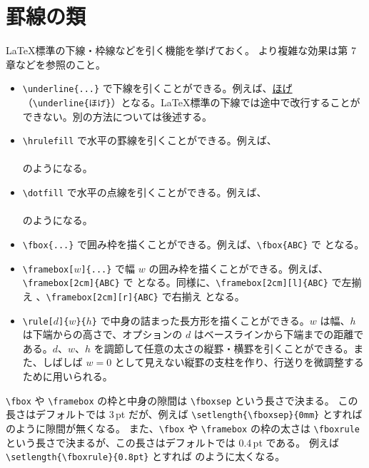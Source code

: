\section{罫線の類}
\LaTeX{}標準の下線・枠線などを引く機能を挙げておく。\enlargethispage{1.00zw}
より複雑な効果は第 7 章などを参照のこと。
\begin{itemize}\setlength{\leftskip}{-1.00zw}%
\item \verb'\underline{...}' で下線を引くことができる。例えば、\underline{ほげ}（\verb'\underline{ほげ}'）となる。\LaTeX{}標準の下線では途中で改行することができない。別の方法については後述する。
\item \verb'\hrulefill' で水平の罫線を引くことができる。例えば、\\
  \hrulefill{} \\
  のようになる。
\item \verb'\dotfill' で水平の点線を引くことができる。例えば、\\
  \dotfill{} \\
  のようになる。
\item \verb'\fbox{...}' で囲み枠を描くことができる。例えば、\verb'\fbox{ABC}' で  となる。
\item \verb'\framebox['$w$\verb']{...}' で幅 $w$ の囲み枠を描くことができる。例えば、\verb'\framebox[2cm]{ABC}' で  となる。同様に、\verb'\framebox[2cm][l]{ABC}' で左揃え 、\verb'\framebox[2cm][r]{ABC}' で右揃え  となる。
\item \verb'\rule['$d$\verb']{'$w$\verb'}{'$h$\verb'}' で中身の詰まった長方形を描くことができる。$w$ は幅、$h$ は下端からの高さで、オプションの $d$ はベースラインから下端までの距離である。$d$、$w$、$h$ を調節して任意の太さの縦罫・横罫を引くことができる。また、しばしば $w=0$ として見えない縦罫の支柱を作り、行送りを微調整するために用いられる。
\end{itemize}
\verb'\fbox' や \verb'\framebox' の枠と中身の隙間は \verb'\fboxsep' という長さで決まる。
この長さはデフォルトでは 3\,pt だが、例えば \verb'\setlength{\fboxsep}{0mm}'\setlength{\fboxsep}{0mm} とすれば \setlength{\fboxsep}{3pt} のように隙間が無くなる。
また、\verb'\fbox' や \verb'\framebox' の枠の太さは \verb'\fboxrule' という長さで決まるが、この長さはデフォルトでは 0.4\,pt である。
例えば \verb'\setlength{\fboxrule}{0.8pt}'\setlength{\fboxrule}{0.8pt} とすれば \setlength{\fboxrule}{0.4pt} のように太くなる。
